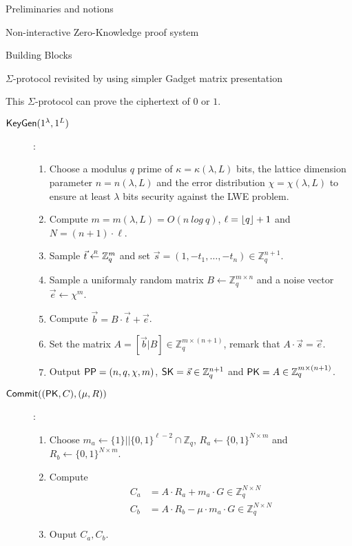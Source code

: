 \begin{section}{Preliminaries and notions}
  \begin{definition}{Non-interactive Zero-Knowledge proof system}
    

  \end{definition}
\end{section}

\begin{section}{Building Blocks}
  \begin{subsection}{$\Sigma$-protocol revisited by using simpler Gadget matrix presentation}

    This $\Sigma$-protocol can prove the ciphertext of $0$ or $1$.

    \begin{description}
    \item[${\mathsf{KeyGen}}(1^\lambda, 1^L)$]:
      \begin{enumerate}
      \item Choose a modulus $q$ prime of $\kappa = \kappa(\lambda, L)$ bits, the lattice dimension parameter $n = n(\lambda, L)$ and the error distribution $\chi = \chi(\lambda, L)$ to ensure at least $\lambda$ bits security against the LWE problem.
      \item Compute $m = m(\lambda, L) = O(n~log~q)$, $\ell = \lfloor q\rfloor+1$ and $N = (n+1) \cdot \ell$.
      \item Sample $\vec{t} \stackrel{{\scriptscriptstyle \mkern4mu R}}{\gets} \mathbb{Z}_q^m$ and set $\vec{s} = (1, -t_1, \dots, -t_n) \in \mathbb{Z}_q^{n+1}$.
      \item Sample a uniformaly random matrix $B \gets \mathbb{Z}_q^{m \times n}$ and a noise vector $\vec{e} \gets \chi^m$.
      \item Compute $\vec{b} = B \cdot \vec{t} + \vec{e}$.
      \item Set the matrix $A = [\vec{b}|B] \in \mathbb{Z}_q^{m \times (n+1)}$, remark that $A \cdot \vec{s} = \vec{e}$.
      \item Output ${\mathsf{PP}} = (n, q, \chi, m)$, $\mathsf{SK} = \vec{s} \in \mathbb{Z}_q^{n+1}$ and $\mathsf{PK} = A \in \mathbb{Z}_q^{m \times (n+1)}$.
      \end{enumerate}
    \item[${\mathsf{Commit}}((\mathsf{PK}, C), (\mu, R))$]:
      \begin{enumerate}
      \item Choose $m_a \gets \{1\}||\{0,1\}^{\ell-2} \cap \mathbb{Z}_q$, $R_a \gets \{0,1\}^{N \times m}$ and $R_b \gets \{0,1\}^{N \times m}$.
      \item Compute
        \begin{align*}
          C_a &= A\cdot R_a + m_a \cdot G \in \mathbb{Z}_q^{N \times N}\\
          C_b &= A\cdot R_b - \mu \cdot m_a \cdot G \in \mathbb{Z}_q^{N \times N}          
        \end{align*}
      \item Ouput $C_a, C_b$.
      \end{enumerate}


\end{description}
\end{subsection}
\end{section}
